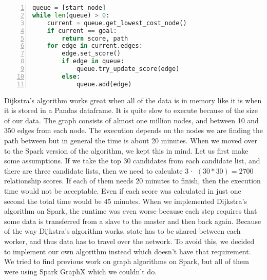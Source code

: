 \begin{lstlisting}[float=h, language=Python, caption=Dijkstra pseudocode, label=CodeDijkstra, numbers=left]
queue = [start_node]
while len(queue) > 0:
    current = queue.get_lowest_cost_node()
    if current == goal:
        return score, path
    for edge in current.edges:
        edge.set_score()
        if edge in queue:
            queue.try_update_score(edge)
        else:
            queue.add(edge)
\end{lstlisting}



Dijkstra's algorithm works great when all of the data is in memory like it is when it is stored in a Pandas dataframe. It is quite slow to execute because of the size of our data. The graph consists of almost one million nodes, and between 10 and 350 edges from each node. The execution depends on the nodes we are finding the path between but in general the time is about 20 minutes. When we moved over to the Spark version of the algorithm, we kept this in mind. Let us first make some assumptions. If we take the top 30 candidates from each candidate list, and there are three candidate lists, then we need to calculate 3· $(30*30)=2700$ relationship scores. If each of them needs 20 minutes to finish, then the execution time would not be acceptable. Even if each score was calculated in just one second the total time would be 45 minutes. When we implemented Dijkstra's algorithm on Spark, the runtime was even worse because each step requires that some data is transferred from a slave to the master and then back again. Because of the way Dijkstra's algorithm works, state has to be shared between each worker, and thus data has to travel over the network. To avoid this, we decided to implement our own algorithm instead which doesn’t have that requirement. We tried to find previous work on graph algorithms on Spark, but all of them were using Spark GraphX which we couldn’t do.

